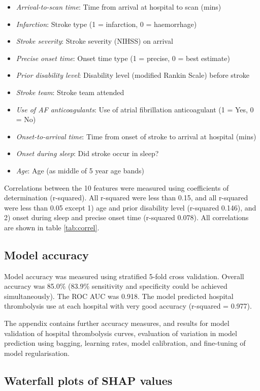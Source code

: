 \begin{itemize}
    \item \emph{Arrival-to-scan time}: Time from arrival at hospital to scan (mins)
    \item \emph{Infarction}: Stroke type (1 = infarction, 0 = haemorrhage)
    \item \emph{Stroke severity}: Stroke severity (NIHSS) on arrival
    \item \emph{Precise onset time}: Onset time type (1 = precise, 0 = best estimate)
    \item \emph{Prior disability level}: Disability level (modified Rankin Scale) before stroke
    \item \emph{Stroke team}: Stroke team attended
    \item \emph{Use of AF anticoagulants}: Use of atrial fibrillation anticoagulant (1 = Yes, 0 = No)
    \item \emph{Onset-to-arrival time}: Time from onset of stroke to arrival at hospital (mins)
    \item \emph{Onset during sleep}: Did stroke occur in sleep?
    \item \emph{Age}: Age (as middle of 5 year age bands)
\end{itemize}

Correlations between the 10 features were measured using coefficients of determination (r-squared). All r-squared were less than 0.15, and all r-squared were less than 0.05 except 1) age and prior disability level (r-squared 0.146), and 2) onset during sleep and precise onset time (r-squared 0.078). All correlations are shown in table \ref{tab:correl}.

\subsection{Model accuracy}

Model accuracy was measured using stratified 5-fold cross validation. Overall accuracy was 85.0\% (83.9\% sensitivity and specificity could be achieved simultaneously). The ROC AUC was 0.918. The model predicted hospital thrombolysis use at each hospital with very good accuracy (r-squared = 0.977).

The appendix contains further accuracy measures, and results for model validation of hospital thrombolysis curves, evaluation of variation in model prediction using bagging, learning rates, model calibration, and fine-tuning of model regularisation.

\subsection{Waterfall plots of SHAP values}

